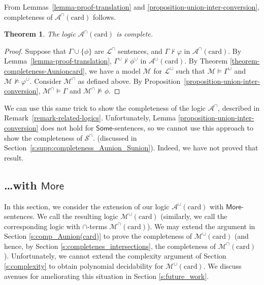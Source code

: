 \documentclass[letterpaper]{article}
\newtheorem{theorem}{Theorem}[section]
\theoremstyle{definition}
\newcommand{\Model}{\mathcal{M}}
\newcommand{\set}[1]{\{ #1 \}}
\newcommand{\proves}{\vdash}
\newcommand{\lang}{\mathcal{L}}
\newcommand{\Aunion}{\mathscr{A}^{\cup}}
\newcommand{\Munion}{\mathscr{M}^{\cup}}
\newcommand{\Ainter}{\mathscr{A}^{\cap}}
\newcommand{\Minter}{\mathscr{M}^{\cap}}
\newcommand{\Sinter}{\mathscr{S}^{\cap}}
\newcommand{\SomeNoArgs}{\mathsf{Some}}
\newcommand{\MoreNoArgs}{\mathsf{More}}
\newcommand{\card}{\mathrm{card}}
\begin{document}
From Lemmas~\ref{lemma-proof-translation} and \ref{proposition-union-inter-conversion}, completeness of $\Ainter(\card)$ follows.  %

\begin{theorem}
    The logic $\Ainter(\card)$ is complete.
    \label{theorem-completeness-intersection}
\end{theorem}

\begin{proof} Suppose that $\Gamma\cup\set{\phi}$ are $\lang^\cap$
sentences, and $\Gamma \not \proves \varphi$ in $\Ainter(\card)$.
By Lemma~\ref{lemma-proof-translation},  $\Gamma^\cup\not\proves\phi^\cup$ in $\Aunion(\card)$.
By Theorem \ref{theorem-completeness-Aunioncard},
we have a model $\Model$ for $\lang^\cup$
such that $\Model \models \Gamma^\cup$ and $\Model \not \models \varphi^\cup$. 
Consider $\Model^\cap$ as defined  above.
By Proposition~\ref{proposition-union-inter-conversion},
$\Model^\cap\models\Gamma$
and $\Model^\cap\not\models\phi$.
\end{proof}

We can use this same trick to show the completeness of the logic $\Ainter$, described in Remark~\ref{remark-related-logics}.  Unfortunately, Lemma \ref{proposition-union-inter-conversion} does not hold for $\SomeNoArgs$-sentences, so we cannot use this approach to show the completeness of $\Sinter$. (discussed in Section~\ref{s:supp:completeness_Aunion_Sunion}).  
Indeed, we have not proved that result.



\subsection{\ldots with $\MoreNoArgs$}

In this section, we consider the extension of our logic $\Aunion(\card)$ with $\MoreNoArgs$-sentences.  We call the resulting logic $\Munion(\card)$ (similarly, we call the corresponding logic with $\cap$-terms $\Minter(\card)$).  We may extend the argument in Section \ref{s:comp_Aunion(card)} to prove the completeness of $\Munion(\card)$ (and hence, by Section \ref{s:completenes_intersections}, the completeness of $\Minter(\card)$).  Unfortunately, we cannot extend the complexity argument of Section \ref{s:complexity} to obtain polynomial decidability for $\Munion(\card)$.  We discuss avenues for ameliorating this situation in Section \ref{s:future_work}.
\end{document}
